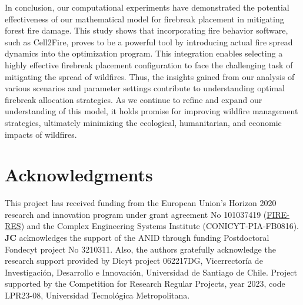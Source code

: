 \documentclass[a4paper,fleqn]{cas-sc}
\begin{document}
In conclusion, our computational experiments have demonstrated the potential effectiveness of our mathematical model for firebreak placement in mitigating forest fire damage. This study shows that incorporating fire behavior software, such as Cell2Fire, proves to be a powerful tool by introducing actual fire spread dynamics into the optimization program. This integration enables selecting a highly effective firebreak placement configuration to face the challenging task of mitigating the spread of wildfires. Thus, the insights gained from our analysis of various scenarios and parameter settings contribute to understanding optimal firebreak allocation strategies. As we continue to refine and expand our understanding of this model, it holds promise for improving wildfire management strategies, ultimately minimizing the ecological, humanitarian, and economic impacts of wildfires.  


\section*{Acknowledgments}
This project has received funding from the European Union’s Horizon 2020 research and innovation program under grant agreement No 101037419 (\href{https://fire-res.eu}{FIRE-RES}) and the Complex Engineering Systems Institute (CONICYT-PIA-FB0816). \textbf{JC} acknowledges the support of the ANID through funding Postdoctoral Fondecyt project No 3210311. Also, the authors gratefully acknowledge the research support provided by Dicyt project 062217DG, Vicerrector\'ia de Investigaci\'on, Desarrollo e Innovaci\'on, Universidad de Santiago de Chile. Project supported by the Competition for Research Regular Projects, year 2023, code LPR23-08, Universidad Tecnológica Metropolitana.




\clearpage



\end{document}
